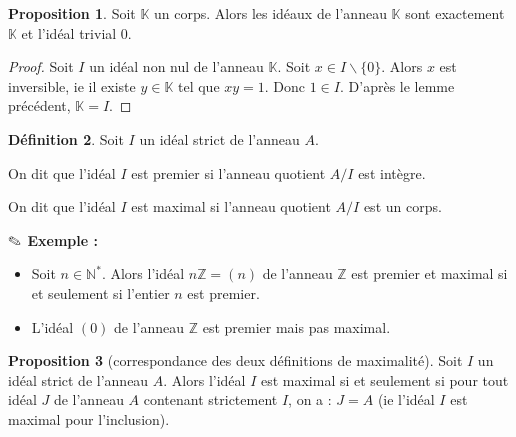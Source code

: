 \documentclass{report}
\newcommand{\Z}{\mathbb{Z}}
\newcommand{\K}{\mathbb{K}}
\newcommand{\N}{\mathbb{N}}
\theoremstyle{definition}
\newtheorem{defi}{Définition}[chapter]
\newtheorem{prop}[defi]{Proposition}
\newcommand{\exem}{{\textbf{$\text{\ding{46}}$ Exemple : \ }}}
\begin{document}
\begin{prop}
Soit $ \K$ un corps. Alors les idéaux de l'anneau $\K$ sont exactement $\K$ et l'idéal trivial ${0}$.
\end{prop}

\begin{proof}
Soit $I$ un idéal non nul de l'anneau $\K$. Soit $x \in I \backslash \{0\}$. Alors $x$ est inversible, ie il existe $y \in \K$ tel que $xy=1$. Donc $1 \in I$. D'après le lemme précédent, $\K=I$.
\end{proof}

\begin{defi}
Soit $I$ un idéal strict de l'anneau $A$.
\begin{point}
\item On dit que l'idéal $I$ est premier si l'anneau quotient $A/I$ est intègre.
\item On dit que l'idéal $I$ est maximal si l'anneau quotient $A/I$ est un corps.
\end{point}
\end{defi}

\exem \begin{itemize}
\item Soit $n \in \N^*$. Alors l'idéal $n\Z=(n)$ de l'anneau $\Z$ est premier et maximal si et seulement si l'entier $n$ est premier.
\item L'idéal $(0)$ de l'anneau $\Z$ est premier mais pas maximal.
\end{itemize}

\begin{prop}[correspondance des deux définitions de maximalité]
Soit $I$ un idéal strict de l'anneau $A$. Alors l'idéal $I$ est maximal si et seulement si pour tout idéal $J$ de l'anneau $A$ contenant strictement $I$, on a : $J=A$ (ie l'idéal $I$ est maximal pour l'inclusion).
\end{prop}
\end{document}
